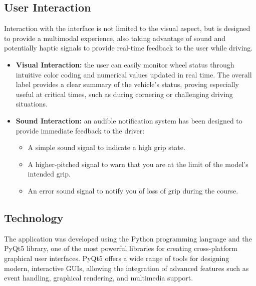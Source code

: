 \documentclass[a4paper,final,12pt]{report}
\begin{document}
\subsection{User Interaction}
Interaction with the interface is not limited to the visual aspect, but is designed to provide a multimodal experience, also taking advantage of sound and potentially haptic signals to provide real-time feedback to the user while driving.

\begin{itemize}
    \item \textbf{Visual Interaction:} the user can easily monitor wheel status through intuitive color coding and numerical values updated in real time. The overall label provides a clear summary of the vehicle's status, proving especially useful at critical times, such as during cornering or challenging driving situations.
    \item \textbf{Sound Interaction:} an audible notification system has been designed to provide immediate feedback to the driver:
    \begin{itemize}
        \item A simple sound signal \cite{bip_sound} to indicate a high grip state.
        \item A higher-pitched signal \cite{bip_sound_machine} to warn that you are at the limit of the model's intended grip.
        \item An error sound signal \cite{beep_warning} to notify you of loss of grip during the course.
    \end{itemize}
\end{itemize}

\subsection{Technology}
The application was developed using the Python programming language and the PyQt5 library, one of the most powerful libraries for creating cross-platform graphical user interfaces. PyQt5 offers a wide range of tools for designing modern, interactive GUIs, allowing the integration of advanced features such as event handling, graphical rendering, and multimedia support.
\end{document}
